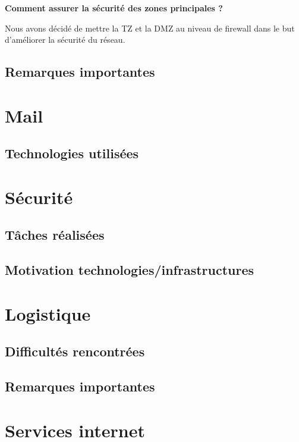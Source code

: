 \documentclass{article}
\begin{document}
      \textbf{Comment assurer la sécurité des zones principales ?} 
     \newline
     
     Nous avons décidé de mettre la TZ et la DMZ au niveau de firewall dans le but d'améliorer la sécurité du réseau.
     
     
     
    \subsection{Remarques importantes}
   

\section{Mail}

\subsection{Technologies utilisées}

 
\section{Sécurité}
    \subsection{Tâches réalisées} 
   
    \subsection{Motivation technologies/infrastructures} 
   
\section{Logistique}
   
    \subsection{Difficultés rencontrées}
    
    \subsection{Remarques importantes}
    
\section{Services internet}
\end{document}
